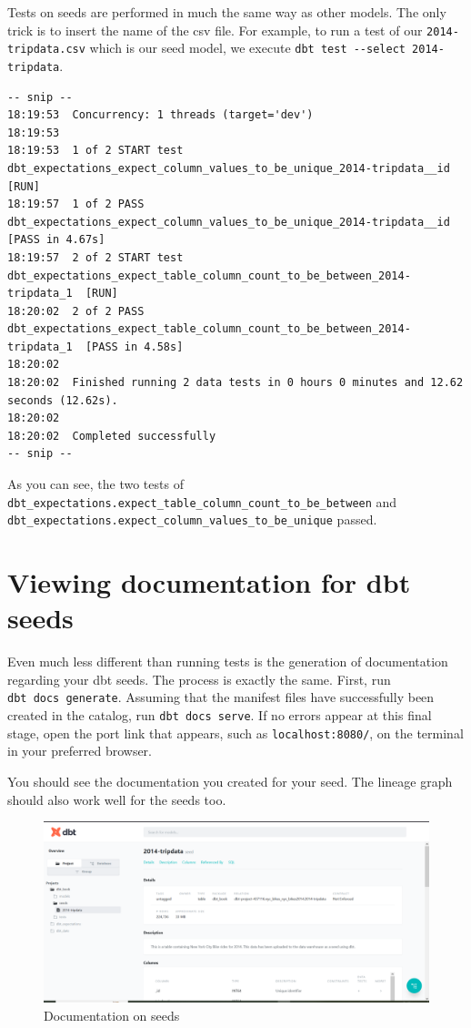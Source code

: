 \documentclass[
]{book}
\begin{document}
Tests on seeds are performed in much the same way as other models. The only trick is to insert the name of the csv file. For example, to run a test of our \texttt{2014-tripdata.csv} which is our seed model, we execute \texttt{dbt\ test\ -\/-select\ 2014-tripdata}.

\begin{verbatim}
-- snip --
18:19:53  Concurrency: 1 threads (target='dev')
18:19:53  
18:19:53  1 of 2 START test dbt_expectations_expect_column_values_to_be_unique_2014-tripdata__id  [RUN]
18:19:57  1 of 2 PASS dbt_expectations_expect_column_values_to_be_unique_2014-tripdata__id  [PASS in 4.67s]
18:19:57  2 of 2 START test dbt_expectations_expect_table_column_count_to_be_between_2014-tripdata_1  [RUN]
18:20:02  2 of 2 PASS dbt_expectations_expect_table_column_count_to_be_between_2014-tripdata_1  [PASS in 4.58s]
18:20:02  
18:20:02  Finished running 2 data tests in 0 hours 0 minutes and 12.62 seconds (12.62s).
18:20:02  
18:20:02  Completed successfully
-- snip --
\end{verbatim}

As you can see, the two tests of \texttt{dbt\_expectations.expect\_table\_column\_count\_to\_be\_between} and \texttt{dbt\_expectations.expect\_column\_values\_to\_be\_unique} passed.

\hypertarget{viewing-documentation-for-dbt-seeds}{%
\section{Viewing documentation for dbt seeds}\label{viewing-documentation-for-dbt-seeds}}

Even much less different than running tests is the generation of documentation regarding your dbt seeds. The process is exactly the same. First, run \texttt{dbt\ docs\ generate}. Assuming that the manifest files have successfully been created in the catalog, run \texttt{dbt\ docs\ serve}. If no errors appear at this final stage, open the port link that appears, such as \texttt{localhost:8080/}, on the terminal in your preferred browser.

You should see the documentation you created for your seed. The lineage graph should also work well for the seeds too.

\begin{figure}
\centering
\includegraphics{./images/seed_documentation.png}
\caption{Documentation on seeds}
\end{figure}
\end{document}
